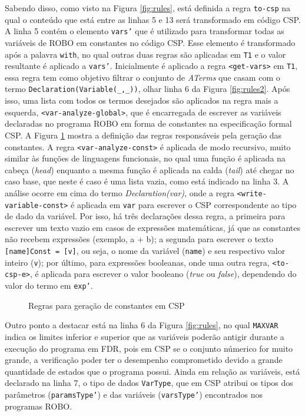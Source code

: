 Sabendo disso, como visto na Figura \ref{fig:rules}, está definida a regra \texttt{to-csp} na qual o conteúdo que está entre as linhas 5 e 13 será transformado em código CSP. A linha 5 contém o elemento \texttt{vars'} que é utilizado para transformar todas as variáveis de ROBO em constantes no código CSP. Esse elemento é transformado após a palavra \texttt{with}, no qual outras duas regras são aplicadas em \texttt{T1} e o valor resultante é aplicado a \texttt{vars'}. Inicialmente é aplicado a regra \texttt{<get-vars>} em \texttt{T1}, essa regra tem como objetivo filtrar o conjunto de \textit{ATerms} que casam com o termo \texttt{Declaration(Variable(\_,\_))}, olhar linha 6 da Figura \ref{fig:rules2}. Após isso, uma lista com todos os termos desejados são aplicados na regra mais a esquerda, \texttt{<var-analyze-global>}, que é encarregada de escrever as variáveis declaradas no programa ROBO em forma de constantes na especificação formal CSP. A Figura \ref{fig:rules_constants} mostra a definição das regras responsáveis pela geração das constantes. A regra \texttt{<var-analyze-const>} é aplicada de modo recursivo, muito similar às funções de linguagens funcionais, no qual uma função é aplicada na cabeça (\textit{head}) enquanto a mesma função é aplicada na calda (\textit{tail}) até chegar no caso base, que neste é caso é uma lista vazia, como está indicado na linha 3. A análise ocorre em cima do termo \textit{Declaration(var)}, onde a regra \texttt{<write-variable-const>} é aplicada em \texttt{var} para escrever o CSP correspondente ao tipo de dado da variável. Por isso, há três declarações dessa regra, a primeira para escrever um texto vazio em casos de expressões matemáticas, já que as constantes não recebem expressões (exemplo, a + b); a segunda para escrever o texto \texttt{[name]Const = [v]}, ou seja, o nome da variável (\texttt{name}) e seu respectivo valor inteiro (\texttt{v}); por último, para expressões booleanas, onde uma outra regra, \texttt{<to-csp-e>}, é aplicada para escrever o valor booleano (\textit{true} ou \textit{false}), dependendo do valor do termo em \texttt{exp'}.

\begin{figure}[h]
\centering
\caption{Regras para geração de constantes em CSP}

\label{fig:rules_constants}
\end{figure}

Outro ponto a destacar está na linha 6 da Figura \ref{fig:rules}, no qual \texttt{MAXVAR} indica os limites inferior e superior que as variáveis poderão antigir durante a execução do programa em FDR, pois em CSP se o conjunto númerico for muito grande, a verificação poder ter o desempenho comprometido devido a grande quantidade de estados que o programa possui. Ainda em relação as variáveis, está declarado na linha 7, o tipo de dados \texttt{VarType}, que em CSP atribui os tipos dos parâmetros (\texttt{paramsType'}) e das variáveis (\texttt{varsType'}) encontrados nos programas ROBO.

